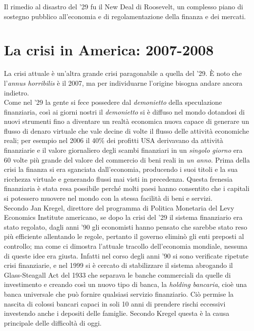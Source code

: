 \documentclass[11pt]{article}
\begin{document}
Il rimedio al disastro del '29 fu il New Deal di Roosevelt,
un complesso piano di sostegno pubblico all'economia e di regolamentazione della finanza e dei mercati.

\section{La crisi in America: 2007-2008}
La crisi attuale \`e un'altra grande crisi paragonabile a quella del '29. \`E noto che
l'\emph{annus horribilis} \`e il 2007, ma per individuarne l'origine bisogna 
andare ancora indietro. \\
Come nel '29 la gente si fece possedere dal
\emph{demonietto} della speculazione finanziaria, cos\`i ai giorni nostri
il \emph{demonietto} si \`e diffuso nel mondo dotandosi
di nuovi strumenti fino a diventare un realt\`a
economica nuova capace di generare un flusso di denaro virtuale che
vale decine di volte il flusso delle attivit\`a economiche reali; per esempio
nel 2006 il 40\% dei profitti USA derivavano da attivit\`a finanziarie e il valore giornaliero
degli scambi finanziari in un \emph{singolo giorno} era 60 volte pi\`u grande del valore del commercio 
di beni reali in \emph{un anno}.
Prima della crisi la finanza si era sganciata dall'economia, producendo i suoi titoli e la sua
ricchezza virtuale e generando flussi mai visti in precedenza.
Questa frenesia finanziaria \`e stata resa possibile perch\'e molti paesi hanno consentito che i capitali
si potessero muovere nel mondo con la stessa facilit\`a di beni e servizi.\\
Secondo Jan Kregel, direttore del programma di Politica Monetaria del 
Levy Economics Institute americano, se dopo la crisi del '29 il sistema finanziario era 
stato regolato, dagli anni '90 gli economisti hanno pensato che sarebbe stato reso 
pi\`u efficiente allentando le regole, pertanto il governo elimin\`o gli enti preposti al controllo;
ma come ci dimostra l'attuale tracollo dell'economia mondiale, nessuna di queste idee era giusta.
Infatti nel corso degli anni '90 si sono verificate ripetute crisi finanziarie, e nel 1999 si \`e cercato di stabilizzare
il sistema abrogando il Glass-Steagall Act del 1933 che separava le
banche commerciali da quelle di investimento e creando cos\`i un nuovo tipo di banca, la \emph{holding bancaria},
cio\`e una banca universale che pu\`o fornire qualsiasi servizio
finanziario. Ci\`o permise la nascita
di colossi bancari capaci in soli 10 anni di prendere rischi
eccessivi investendo anche i depositi delle famiglie.
Secondo Kregel questa \`e la causa principale delle difficolt\`a di oggi.
\end{document}
